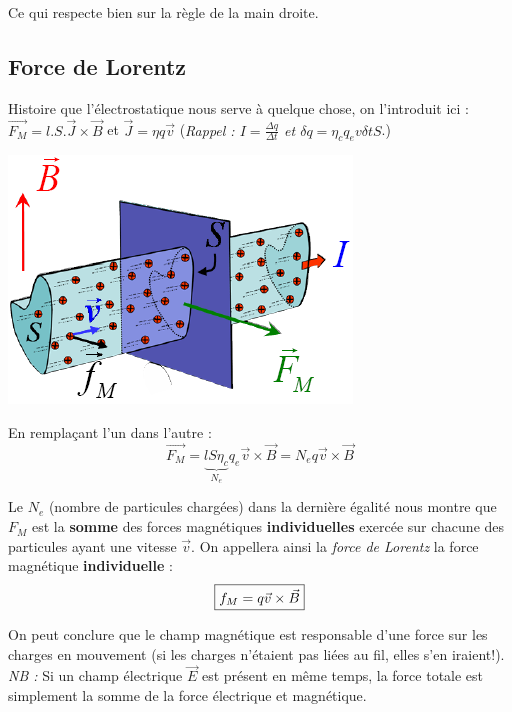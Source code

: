 \documentclass	[11pt, a4paper, openany]{book}
\begin{document}
Ce qui respecte bien sur la règle de la main droite.

\subsection{Force de Lorentz}
Histoire que l'électrostatique nous serve à quelque chose, on l'introduit ici :
$\vec{F_M} =  l.S.\vec{J} \times \vec{B}$ et $\vec{J} =  \eta q \vec{v}$ (\textit{Rappel  : $I = \frac{\Delta q}{\Delta t}$ et $\delta q = \eta_c q_e v \delta t S$}.) 
\begin{center}
\includegraphics[scale=0.55]{magneto/image4.png}
\end{center}
En remplaçant l'un dans l'autre :
\begin{equation}
\vec{F_M} = \underbrace{lS\eta_c}_{N_e} q_e \vec{v} \times \vec{B} = N_eq \vec{v} \times \vec{B}
\end{equation}

Le $N_e$ (nombre de particules chargées) dans la dernière égalité nous montre que $F_M$ est la \textbf{somme} des forces magnétiques \textbf{individuelles} exercée sur chacune des particules ayant une vitesse $\vec{v}$. On appellera ainsi la \textit{force de Lorentz} la force magnétique \textbf{individuelle} :
\begin{equation}
\fbox{$f_M = q \vec{v} \times \vec{B} $}
\end{equation}

On peut conclure que le champ magnétique est responsable d'une force sur les charges en mouvement (si les charges n'étaient pas liées au fil, elles s'en iraient!).\\


\textit{NB : } Si un champ électrique $\vec{E}$ est présent en même temps, la force totale est simplement la somme de la force électrique et magnétique.
\end{document}
